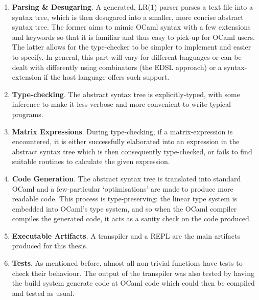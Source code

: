 \begin{enumerate}

    \item \textbf{Parsing \& Desugaring}. A generated, LR(1) parser parses a text
        file into a syntax tree, which is then desugared into a smaller, more
        concise abstract syntax tree. The former aims to mimic OCaml syntax
        with a few extensions and keywords so that it is familiar and thus easy
        to pick-up for OCaml users. The latter allows for the type-checker to
        be simpler to implement and easier to specify. In general, this part
        will vary for different languages or can be dealt with differently
        using combinators (the EDSL approach) or a syntax-extension if the host
        language offers such support.

    \item \textbf{Type-checking}. The abstract syntax tree is explicitly-typed,
        with some inference to make it less verbose and more convenient to
        write typical programs.

    \item \textbf{Matrix Expressions}. During type-checking, if a matrix-expression
        is encountered, it is either successfully elaborated into an expression
        in the abstract syntax tree which is then consequently type-checked, or
        fails to find suitable routines to calculate the given expression.

    \item \textbf{Code Generation}. The abstract syntax tree is translated into
        standard OCaml and a few-particular `optimisations' are made to produce
        more readable code. This process is type-preserving: the linear type
        system is embedded into OCaml's type system, and so when the OCaml compiler
        compiles the generated code, it acts as a sanity check on the code produced.

    \item \textbf{Executable Artifacts}. A transpiler and a REPL are the main artifacts
        produced for this thesis.

    \item \textbf{Tests}. As mentioned before, almost all non-trivial functions
        have tests to check their behaviour. The output of the transpiler
        was also tested by having the build system generate code at OCaml code
        which could then be compiled and tested as usual.

\end{enumerate}

